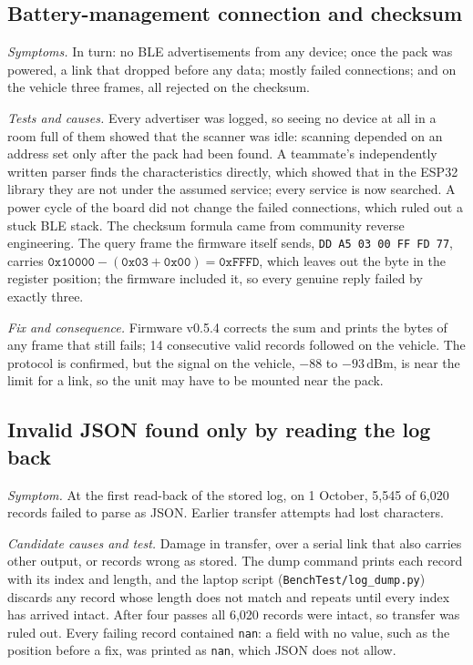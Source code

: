 \subsection{Battery-management connection and checksum}
\label{sec:inv-bms}

\emph{Symptoms.} In turn: no BLE advertisements from any device; once the pack was powered, a link that dropped before any data; mostly failed connections; and on the vehicle three frames, all rejected on the checksum.

\emph{Tests and causes.} Every advertiser was logged, so seeing no device at all in a room full of them showed that the scanner was idle: scanning depended on an address set only after the pack had been found. A teammate's independently written parser finds the characteristics directly, which showed that in the ESP32 library they are not under the assumed service; every service is now searched. A power cycle of the board did not change the failed connections, which ruled out a stuck BLE stack. The checksum formula came from community reverse engineering. The query frame the firmware itself sends, \texttt{DD A5 03 00 FF FD 77}, carries $\mathtt{0x10000} - (\mathtt{0x03} + \mathtt{0x00}) = \mathtt{0xFFFD}$, which leaves out the byte in the register position; the firmware included it, so every genuine reply failed by exactly three.

\emph{Fix and consequence.} Firmware v0.5.4 corrects the sum and prints the bytes of any frame that still fails; 14 consecutive valid records followed on the vehicle. The protocol is confirmed, but the signal on the vehicle, $-88$ to $-93$\,dBm, is near the limit for a link, so the unit may have to be mounted near the pack.

\subsection{Invalid JSON found only by reading the log back}
\label{sec:inv-json}

\emph{Symptom.} At the first read-back of the stored log, on 1 October, 5,545 of 6,020 records failed to parse as JSON. Earlier transfer attempts had lost characters.

\emph{Candidate causes and test.} Damage in transfer, over a serial link that also carries other output, or records wrong as stored. The dump command prints each record with its index and length, and the laptop script (\texttt{BenchTest/log\_dump.py}) discards any record whose length does not match and repeats until every index has arrived intact. After four passes all 6,020 records were intact, so transfer was ruled out. Every failing record contained \texttt{nan}: a field with no value, such as the position before a fix, was printed as \texttt{nan}, which JSON does not allow.


